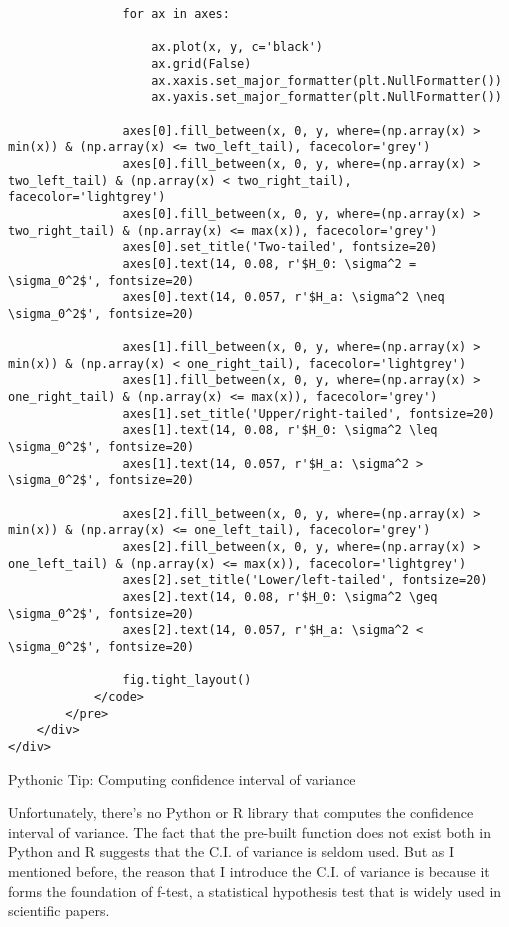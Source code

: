 \documentclass[11pt]{article}
\begin{document}
\begin{verbatim}
                for ax in axes:

                    ax.plot(x, y, c='black')
                    ax.grid(False)
                    ax.xaxis.set_major_formatter(plt.NullFormatter())
                    ax.yaxis.set_major_formatter(plt.NullFormatter())

                axes[0].fill_between(x, 0, y, where=(np.array(x) > min(x)) & (np.array(x) <= two_left_tail), facecolor='grey')
                axes[0].fill_between(x, 0, y, where=(np.array(x) > two_left_tail) & (np.array(x) < two_right_tail), facecolor='lightgrey')
                axes[0].fill_between(x, 0, y, where=(np.array(x) > two_right_tail) & (np.array(x) <= max(x)), facecolor='grey')
                axes[0].set_title('Two-tailed', fontsize=20)
                axes[0].text(14, 0.08, r'$H_0: \sigma^2 = \sigma_0^2$', fontsize=20)
                axes[0].text(14, 0.057, r'$H_a: \sigma^2 \neq \sigma_0^2$', fontsize=20)

                axes[1].fill_between(x, 0, y, where=(np.array(x) > min(x)) & (np.array(x) < one_right_tail), facecolor='lightgrey')
                axes[1].fill_between(x, 0, y, where=(np.array(x) > one_right_tail) & (np.array(x) <= max(x)), facecolor='grey')
                axes[1].set_title('Upper/right-tailed', fontsize=20)
                axes[1].text(14, 0.08, r'$H_0: \sigma^2 \leq \sigma_0^2$', fontsize=20)
                axes[1].text(14, 0.057, r'$H_a: \sigma^2 > \sigma_0^2$', fontsize=20)

                axes[2].fill_between(x, 0, y, where=(np.array(x) > min(x)) & (np.array(x) <= one_left_tail), facecolor='grey')
                axes[2].fill_between(x, 0, y, where=(np.array(x) > one_left_tail) & (np.array(x) <= max(x)), facecolor='lightgrey')
                axes[2].set_title('Lower/left-tailed', fontsize=20)
                axes[2].text(14, 0.08, r'$H_0: \sigma^2 \geq \sigma_0^2$', fontsize=20)
                axes[2].text(14, 0.057, r'$H_a: \sigma^2 < \sigma_0^2$', fontsize=20)

                fig.tight_layout()
            </code>
        </pre>
    </div>
</div>
\end{verbatim}

    \hypertarget{python_ci_var}{}

Pythonic Tip: Computing confidence interval of variance

Unfortunately, there's no Python or R library that computes the
confidence interval of variance. The fact that the pre-built function
does not exist both in Python and R suggests that the C.I. of variance
is seldom used. But as I mentioned before, the reason that I introduce
the C.I. of variance is because it forms the foundation of f-test, a
statistical hypothesis test that is widely used in scientific papers.
\end{document}
